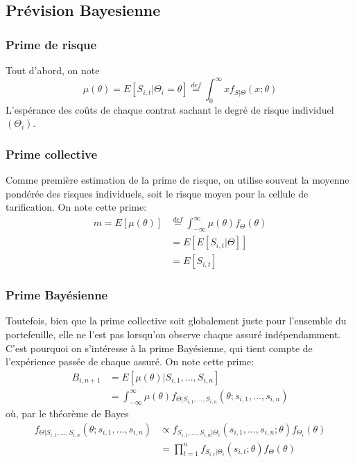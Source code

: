 \documentclass[11pt,french]{report}
\begin{document}
\subsection{Prévision Bayesienne}

\subsubsection{Prime de risque } 

Tout d'abord, on note
$$\boxed{\mu(\theta) = E[S_{i,t}|\Theta_i=\theta] \overset{def}{=} \int_0^{\infty} x f_{S|\Theta}(x;\theta)} $$
L'espérance des coûts de chaque contrat sachant le degré de risque individuel $(\Theta_i)$.

\subsubsection{Prime collective } 

Comme première estimation de la prime de risque, on utilise souvent la moyenne pondérée des risques individuels, soit le risque moyen pour la cellule de tarification. On note cette prime:
$$ \boxed{\begin{aligned}
m = E[\mu(\theta)] &\overset{def}{=} \int_{-\infty}^{\infty} \mu(\theta) f_{\Theta}(\theta) \\
 &= E[E[S_{i,t}|\Theta]] \\
 &= E[S_{i,t}] 
 \end{aligned}}$$

\subsubsection{Prime Bayésienne } 

Toutefois, bien que la prime collective soit globalement juste pour l'ensemble du portefeuille, elle ne l'est pas lorsqu'on observe chaque assuré indépendamment. C'est pourquoi on s'intéresse à la prime Bayésienne, qui tient compte de l'expérience passée de chaque assuré. On note cette prime:
$$ \boxed{\begin{aligned} 
B_{i,n+1}&=E[\mu(\theta)|S_{i,1},...,S_{i,n}] \\
&= \int_{-\infty}^{\infty} \mu(\theta)  f_{\Theta|S_{i,1},...,S_{i,n}}(\theta;s_{i,1},...,s_{i,n}) \end{aligned}}$$
où, par le théorème de Bayes
$$\begin{aligned} 
f_{\Theta|S_{i,1},...,S_{i,n}}(\theta;s_{i,1},...,s_{i,n}) &\propto f_{S_{i,1},...,S_{i,n}|\Theta_i}(s_{i,1},...,s_{i,n};\theta) f_{\Theta_i}(\theta) \\
&= \prod_{t=1}^n f_{S_{i,t}|\Theta_i}(s_{i,t};\theta)f_{\Theta}(\theta) 
\end{aligned}$$
\end{document}

